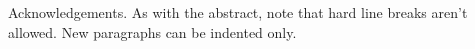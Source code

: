 Acknowledgements. As with the abstract, note that hard line breaks aren't allowed. New paragraphs can be indented only.

